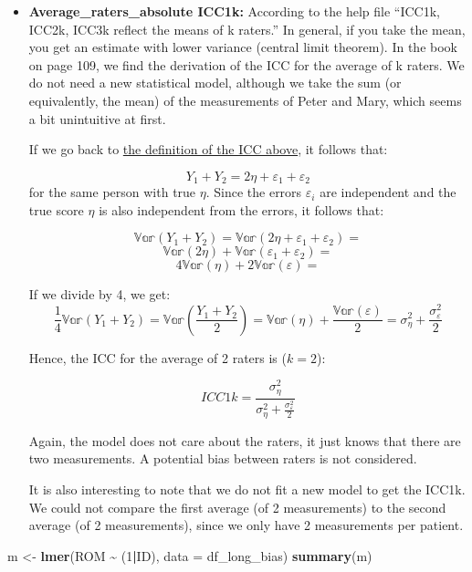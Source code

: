 \documentclass[
]{book}
\newenvironment{Shaded}{\begin{snugshade}}{\end{snugshade}}
\newcommand{\AttributeTok}[1]{\textcolor[rgb]{0.13,0.29,0.53}{#1}}
\newcommand{\DecValTok}[1]{\textcolor[rgb]{0.00,0.00,0.81}{#1}}
\newcommand{\FunctionTok}[1]{\textcolor[rgb]{0.13,0.29,0.53}{\textbf{#1}}}
\newcommand{\NormalTok}[1]{#1}
\newcommand{\OtherTok}[1]{\textcolor[rgb]{0.56,0.35,0.01}{#1}}
\newcommand{\SpecialCharTok}[1]{\textcolor[rgb]{0.81,0.36,0.00}{\textbf{#1}}}
\begin{document}
\begin{itemize}
\item
  \textbf{Average\_raters\_absolute ICC1k:}
  According to the help file ``ICC1k, ICC2k, ICC3k reflect the means of k raters.''
  In general, if you take the mean, you get an estimate with lower variance (central limit theorem).
  In the book on page 109, we find the derivation of the ICC for the average of k raters.
  We do not need a new statistical model, although we take the sum (or equivalently, the mean) of the
  measurements of Peter and Mary, which seems a bit unintuitive at first.

  If we go back to \hyperref[ICC]{the definition of the ICC above}, it follows that:

  \[Y_{1} + Y_{2} = 2 \eta + \varepsilon_1 + \varepsilon_2\]
  for the same person with true \(\eta\). Since the errors \(\varepsilon_i\) are
  independent and the true score \(\eta\) is also independent from the errors,
  it follows that:

  \[\mathbb{Var}(Y_1 + Y_2) = \mathbb{Var}(2 \eta + \varepsilon_1 + \varepsilon_2)=\]
  \[ \mathbb{Var}(2 \eta) + \mathbb{Var}(\varepsilon_1 + \varepsilon_2)=\]
  \[4 \mathbb{Var}(\eta) + 2 \mathbb{Var}(\varepsilon)=\]

  If we divide by 4, we get:
  \[\frac{1}{4}\mathbb{Var}(Y_1 + Y_2) = \mathbb{Var}(\frac{Y_1 + Y_2}{2}) = 
  \mathbb{Var}(\eta) + \frac{\mathbb{Var}(\varepsilon)}{2} = 
  \sigma_{\eta}^2 + \frac{\sigma_{\varepsilon}^2}{2}\]

  Hence, the ICC for the average of 2 raters is (\(k=2\)):

  \[ICC1k = \frac{\sigma_{\eta}^2}{\sigma_{\eta}^2 + \frac{\sigma_{\varepsilon}^2}{2}}\]

  Again, the model does not care about the raters, it just knows that there are
  two measurements. A potential bias between raters is not considered.

  It is also interesting to note that we do not fit a new model to get the ICC1k.
  We could not compare the first average (of 2 measurements) to the second average
  (of 2 measurements), since we only have 2 measurements per patient.
\end{itemize}

\begin{Shaded}
\begin{Highlighting}[]
\NormalTok{m }\OtherTok{\textless{}{-}} \FunctionTok{lmer}\NormalTok{(ROM }\SpecialCharTok{\textasciitilde{}}\NormalTok{ (}\DecValTok{1}\SpecialCharTok{|}\NormalTok{ID), }\AttributeTok{data =}\NormalTok{ df\_long\_bias)}
\FunctionTok{summary}\NormalTok{(m)}
\end{Highlighting}
\end{Shaded}
\end{document}

